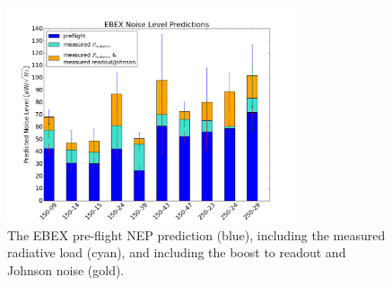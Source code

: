 \begin{figure}[ht!]
\begin{center}
\includegraphics[height=2.5in]{figures/ebex_noise_level_predictions_barchart_per_wafer}
\caption{The \ac{EBEX} pre-flight \ac{NEP} prediction (blue), including the measured radiative load (cyan), and including the boost to readout and Johnson noise (gold).
\label{fig:prediction_bar_chart} }
\end{center}
\end{figure}

